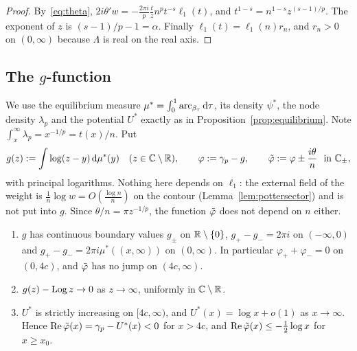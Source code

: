 \begin{proof}
By~\eqref{eq:theta}, $2i\theta'w=-\frac{2\pi i}{p}\frac{t}{z}n^pt^{-s}\ell_1(t)$, and $t^{1-s}=n^{1-s}z^{(s-1)/p}$.
The exponent of $z$ is $(s-1)/p-1=\alpha$. Finally $\ell_1(t)=\ell_1(n)r_n$, and $r_n>0$ on $(0,\infty)$ because
$\Lambda$ is real on the real axis.
\end{proof}

\subsection{\texorpdfstring{The $g$-function}{The g-function}}\label{sec:frame-g}
We use the equilibrium measure $\mu^*=\int_0^1\mathrm{arc}_{\beta_\tau}\,\mathrm{d}\tau$, its density $\psi^*$, the node
density $\lambda_p$ and the potential $U^*$ exactly as in Proposition~\ref{prop:equilibrium}. Note
$\int_x^\infty\lambda_p=x^{-1/p}=t(x)/n$. Put
\begin{equation}\label{eq:g}
  g(z):=\int\log(z-y)\,\mathrm{d}\mu^*(y)\quad(z\in\mathbb{C}\setminus\mathbb{R}),\qquad
  \varphi:=\gamma_p-g,\qquad \tilde\varphi:=\varphi\pm\frac{i\theta}{n}\ \text{ in }\mathbb{C}_\pm,
\end{equation}
with principal logarithms. Nothing here depends on $\ell_1$: the external field of the weight is
$\frac1n\log w=O(\frac{\log n}{n})$ on the contour (Lemma~\ref{lem:pottersector}) and is not put into $g$. Since
$\theta/n=\pi z^{-1/p}$, the function $\tilde\varphi$ does not depend on $n$ either.

\begin{lemma}[$g$-function]\label{lem:gfunction}
\begin{enumerate}
\item[(i)] $g$ has continuous boundary values $g_\pm$ on $\mathbb{R}\setminus\{0\}$, $g_+-g_-=2\pi i$ on $(-\infty,0)$ and
  $g_+-g_-=2\pi i\mu^*((x,\infty))$ on $(0,\infty)$. In particular $\varphi_++\varphi_-=0$ on $(0,4c)$, and $\tilde\varphi$
  has no jump on $(4c,\infty)$.
\item[(ii)] $g(z)-\operatorname{Log} z\to0$ as $z\to\infty$, uniformly in $\mathbb{C}\setminus\mathbb{R}$.
\item[(iii)] $U^*$ is strictly increasing on $[4c,\infty)$, and $U^*(x)=\log x+o(1)$ as $x\to\infty$. Hence
  $\operatorname{Re}\tilde\varphi(x)=\gamma_p-U^*(x)<0$ for $x>4c$, and $\operatorname{Re}\tilde\varphi(x)\le-\frac12\log x$ for $x\ge x_0$.
\end{enumerate}
\end{lemma}

